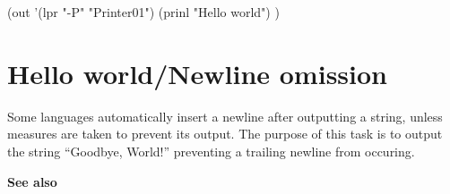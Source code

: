 \begin{wideverbatim}

(out '(lpr "-P" "Printer01")
   (prinl "Hello world") )

\end{wideverbatim}

\pagebreak{}
\section*{Hello world/Newline omission}

Some languages automatically insert a newline after outputting a string,
unless measures are taken to prevent its output. The purpose of this
task is to output the string ``Goodbye, World!'' preventing a trailing
newline from occuring.

\textbf{See also}

